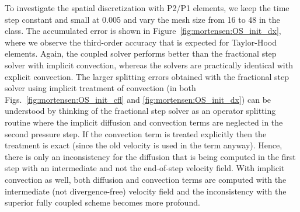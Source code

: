 To investigate the spatial discretization with P2/P1 elements, we
keep the time step constant and small at 0.005 and vary the mesh size
from 16 to 48 in the  class. The accumulated error is
shown in Figure~\ref{fig:mortensen:OS_init_dx}, where we observe the
third-order accuracy that is expected for Taylor-Hood elements. Again,
the coupled solver performs better than the fractional step solver
with implicit convection, whereas the solvers are practically identical
with explicit convection. The larger splitting errors obtained with the
fractional step solver using implicit treatment of convection (in both
Figs.~\ref{fig:mortensen:OS_init_cfl} and \ref{fig:mortensen:OS_init_dx})
can be understood by thinking of the fractional step solver as an operator
splitting routine where the implicit diffusion and convection terms are
neglected in the second pressure step. If the convection term is treated
explicitly then the treatment is exact (since the old velocity is used in the
term anyway). Hence, there is only an inconsistency for the diffusion
that is being computed in the first step with an intermediate and not
the end-of-step velocity field. With implicit convection as well, both
diffusion and convection terms are computed with the intermediate (not
divergence-free) velocity field and the inconsistency with the superior
fully coupled scheme becomes more profound.

